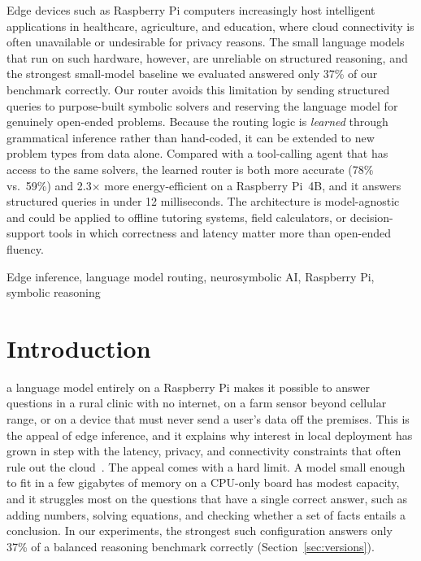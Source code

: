 \documentclass[journal]{IEEEtai}
\begin{document}
\begin{IEEEImpStatement}
Edge devices such as Raspberry Pi computers increasingly host intelligent applications in healthcare, agriculture, and education, where cloud connectivity is often unavailable or undesirable for privacy reasons. The small language models that run on such hardware, however, are unreliable on structured reasoning, and the strongest small-model baseline we evaluated answered only 37\% of our benchmark correctly. Our router avoids this limitation by sending structured queries to purpose-built symbolic solvers and reserving the language model for genuinely open-ended problems. Because the routing logic is \emph{learned} through grammatical inference rather than hand-coded, it can be extended to new problem types from data alone. Compared with a tool-calling agent that has access to the same solvers, the learned router is both more accurate (78\% vs.\ 59\%) and 2.3$\times$ more energy-efficient on a Raspberry Pi~4B, and it answers structured queries in under 12 milliseconds. The architecture is model-agnostic and could be applied to offline tutoring systems, field calculators, or decision-support tools in which correctness and latency matter more than open-ended fluency.
\end{IEEEImpStatement}

\begin{IEEEkeywords}
Edge inference, language model routing, neurosymbolic AI, Raspberry Pi, symbolic reasoning
\end{IEEEkeywords}

\section{Introduction}
\label{sec:intro}

 a language model entirely on a Raspberry Pi makes it possible to answer questions in a rural clinic with no internet, on a farm sensor beyond cellular range, or on a device that must never send a user's data off the premises. This is the appeal of edge inference, and it explains why interest in local deployment has grown in step with the latency, privacy, and connectivity constraints that often rule out the cloud~\cite{xu2024edgellm}. The appeal comes with a hard limit. A model small enough to fit in a few gigabytes of memory on a CPU-only board has modest capacity, and it struggles most on the questions that have a single correct answer, such as adding numbers, solving equations, and checking whether a set of facts entails a conclusion. In our experiments, the strongest such configuration answers only 37\% of a balanced reasoning benchmark correctly (Section~\ref{sec:versions}).
\end{document}
